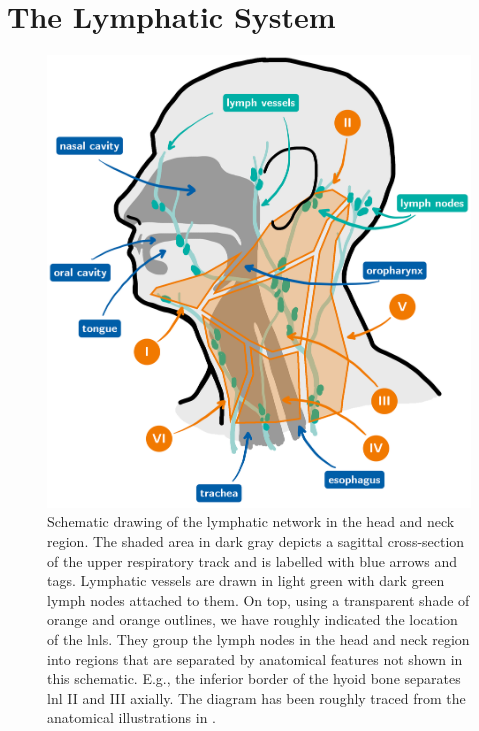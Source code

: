 \documentclass[\relativeRoot/main.tex]{subfiles}
\begin{document}
\section{The Lymphatic System}
\label{sec:intro:lymph_system}

\begin{figure}
    \centering
    \includegraphics[width=\textwidth]{figures/head_and_neck_labelled.png}
    \caption[
        Schematic drawing of the head and neck region.
    ]{
        Schematic drawing of the lymphatic network in the head and neck region. The shaded area in dark gray depicts a sagittal cross-section of the upper respiratory track and is labelled with blue arrows and tags. Lymphatic vessels are drawn in light green with dark green lymph nodes attached to them. On top, using a transparent shade of orange and orange outlines, we have roughly indicated the location of the \glspl{lnl}. They group the lymph nodes in the head and neck region into regions that are separated by anatomical features not shown in this schematic. E.g., the inferior border of the hyoid bone separates \gls{lnl} II and III axially. The diagram has been roughly traced from the anatomical illustrations in .
    }
    \label{fig:intro:schematics_head}
\end{figure}
\end{document}
